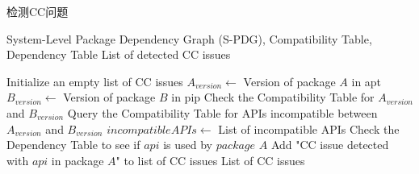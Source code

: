 \begin{algorithm}[htbp]
	\caption{检测CC问题}
	\label{alg:DetectCC}
	\begin{algorithmic}[1]
		\REQUIRE System-Level Package Dependency Graph (S-PDG), Compatibility Table, Dependency Table
		\ENSURE List of detected CC issues
		
		\STATE Initialize an empty list of CC issues
		\STATE $A_{version} \gets$ Version of package $A$ in apt
		\STATE $B_{version} \gets$ Version of package $B$ in pip
		\STATE Check the Compatibility Table for $A_{version}$ and $B_{version}$
		\STATE Query the Compatibility Table for APIs incompatible between $A_{version}$ and $B_{version}$
		\STATE $incompatibleAPIs \gets$ List of incompatible APIs
		\STATE Check the Dependency Table to see if $api$ is used by $package$ $A$
		\STATE Add "CC issue detected with $api$ in package $A$" to list of CC issues
		\ENDIF
		\ENDFOR
		\ENDIF
		\ENDFOR
		\RETURN List of CC issues
	\end{algorithmic}
\end{algorithm}
